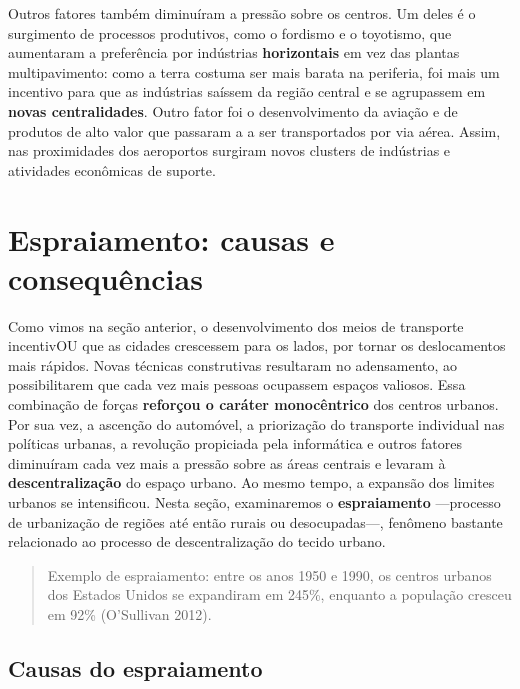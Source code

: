 \documentclass[
  12pt,
  a4paper,
]{article}
\begin{document}
Outros fatores também diminuíram a pressão sobre os centros. Um deles é
o surgimento de processos produtivos, como o fordismo e o toyotismo, que
aumentaram a preferência por indústrias \textbf{horizontais} em vez das
plantas multipavimento: como a terra costuma ser mais barata na
periferia, foi mais um incentivo para que as indústrias saíssem da
região central e se agrupassem em \textbf{novas centralidades}. Outro
fator foi o desenvolvimento da aviação e de produtos de alto valor que
passaram a a ser transportados por via aérea. Assim, nas proximidades
dos aeroportos surgiram novos clusters de indústrias e atividades
econômicas de suporte.

\hypertarget{espraiamento-causas-e-consequuxeancias}{%
\section{Espraiamento: causas e
consequências}\label{espraiamento-causas-e-consequuxeancias}}

Como vimos na seção anterior, o desenvolvimento dos meios de transporte
incentivOU que as cidades crescessem para os lados, por tornar os
deslocamentos mais rápidos. Novas técnicas construtivas resultaram no
adensamento, ao possibilitarem que cada vez mais pessoas ocupassem
espaços valiosos. Essa combinação de forças \textbf{reforçou o caráter
monocêntrico} dos centros urbanos. Por sua vez, a ascenção do automóvel,
a priorização do transporte individual nas políticas urbanas, a
revolução propiciada pela informática e outros fatores diminuíram cada
vez mais a pressão sobre as áreas centrais e levaram à
\textbf{descentralização} do espaço urbano. Ao mesmo tempo, a expansão
dos limites urbanos se intensificou. Nesta seção, examinaremos o
\textbf{espraiamento} ---processo de urbanização de regiões até então
rurais ou desocupadas---, fenômeno bastante relacionado ao processo de
descentralização do tecido urbano.

\begin{quote}
Exemplo de espraiamento: entre os anos 1950 e 1990, os centros urbanos
dos Estados Unidos se expandiram em 245\%, enquanto a população cresceu
em 92\% (O'Sullivan 2012).
\end{quote}

\hypertarget{causas-do-espraiamento}{%
\subsection{Causas do espraiamento}\label{causas-do-espraiamento}}
\end{document}
